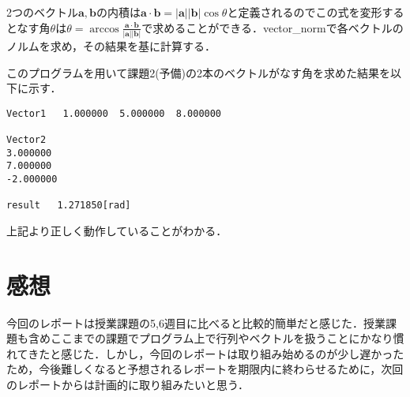 \documentclass[dvipdfmx,titlepage]{jsarticle}
\begin{document}
2つのベクトル$\bm{a}, \bm{b}$の内積は$\bm{a}\cdot \bm{b} = \left|\bm{a}\right|\left|\bm{b}\right|\cos\theta$と定義されるのでこの式を変形するとなす角$\theta$は$\displaystyle \theta = \arccos{\frac{\bm{a}\cdot \bm{b}}{\left|\bm{a}\right|\left|\bm{b}\right|}}$で求めることができる．vector\_normで各ベクトルのノルムを求め，その結果を基に計算する．

このプログラムを用いて課題2(予備)の2本のベクトルがなす角を求めた結果を以下に示す．

\begin{verbatim}
Vector1   1.000000  5.000000  8.000000

Vector2
3.000000
7.000000
-2.000000

result   1.271850[rad]
\end{verbatim}

上記より正しく動作していることがわかる．

\section{感想}
今回のレポートは授業課題の5,6週目に比べると比較的簡単だと感じた．授業課題も含めここまでの課題でプログラム上で行列やベクトルを扱うことにかなり慣れてきたと感じた．しかし，今回のレポートは取り組み始めるのが少し遅かったため，今後難しくなると予想されるレポートを期限内に終わらせるために，次回のレポートからは計画的に取り組みたいと思う．
\end{document}
